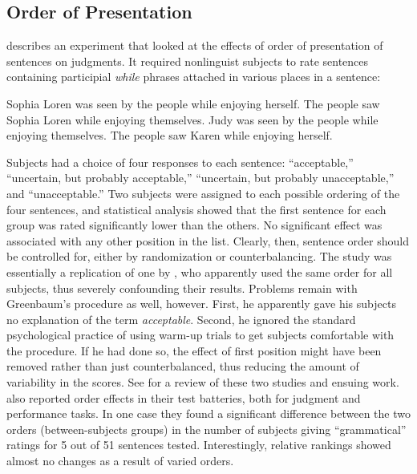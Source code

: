 \subsection{Order of Presentation}\label{sec:5.2.2}

\citet{Greenbaum1973,Greenbaum1976a} describes an experiment that looked at the effects of order of presentation of sentences on judgments. It required nonlinguist subjects to rate sentences containing participial \textit{while} phrases attached in various places in a sentence:


\ea%
    \label{ex:5:1}
    \ea Sophia Loren was seen by the people while enjoying herself.
    \ex The people saw Sophia Loren while enjoying themselves.
    \ex Judy was seen by the people while enjoying themselves. 
    \ex The people saw Karen while enjoying herself.
    \z
    \z

\noindent
Subjects had a choice of four responses to each sentence: ``acceptable,'' ``uncertain, but probably acceptable,'' ``uncertain, but probably unacceptable,'' and ``unacceptable.'' Two subjects were assigned to each possible ordering of the four sentences, and statistical analysis showed that the first sentence for each group was rated significantly lower than the others. No significant effect was associated with any other position in the list. Clearly, then, sentence order should be controlled for, either by randomization or counterbalancing. The study was essentially a replication of one by \citet{ElliotEtAl1969}, who apparently used the same order for all subjects, thus severely confounding their results. Problems remain with Greenbaum's procedure as well, however. First, he apparently gave his
subjects no explanation of the term \textit{acceptable}. Second, he ignored the standard psychological practice of using warm-up trials to get subjects comfortable with the procedure. If he had done so, the effect of first position might have been removed rather than just counterbalanced, thus reducing the amount of variability in the scores. See \citet[21]{Labov1975} for a review of these two studies and ensuing work. \citet{GreenbaumEtAl1970} also reported order effects in their test batteries, both for judgment and performance tasks. In one case they found a significant difference between the two orders (between-subjects groups) in the number of subjects giving ``grammatical'' ratings for 5 out of 51 sentences tested. Interestingly, relative rankings showed almost no changes as a result of varied orders.

